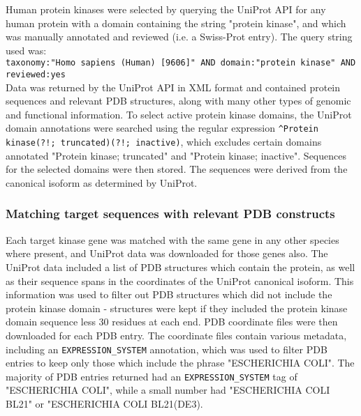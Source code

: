 \documentclass[aps,pre,twocolumn,nofootinbib,superscriptaddress,linenumbers]{revtex4-1}
\begin{document}
Human protein kinases were selected by querying the UniProt API for any human protein with a domain containing the string "protein kinase", and which was manually annotated and reviewed (i.e. a Swiss-Prot entry).
The query string used was:\\
{\tt taxonomy:"Homo sapiens (Human) [9606]" AND domain:"protein kinase" AND reviewed:yes}\\
Data was returned by the UniProt API in XML format and contained protein sequences and relevant PDB structures, along with many other types of genomic and functional information.
To select active protein kinase domains, the UniProt domain annotations were searched using the regular expression {\tt \^{}Protein kinase(?!; truncated)(?!; inactive)}, which excludes certain domains annotated "Protein kinase; truncated" and "Protein kinase; inactive".
Sequences for the selected domains were then stored.
The sequences were derived from the canonical isoform as determined by UniProt.

\subsubsection{Matching target sequences with relevant PDB constructs}

Each target kinase gene was matched with the same gene in any other species where present, and UniProt data was downloaded for those genes also.
The UniProt data included a list of PDB structures which contain the protein, as well as their sequence spans in the coordinates of the UniProt canonical isoform.
This information was used to filter out PDB structures which did not include the protein kinase domain - structures were kept if they included the protein kinase domain sequence less 30 residues at each end.
PDB coordinate files were then downloaded for each PDB entry.
The coordinate files contain various metadata, including an {\tt EXPRESSION\_SYSTEM} annotation, which was used to filter PDB entries to keep only those which include the phrase "ESCHERICHIA COLI".
The majority of PDB entries returned had an {\tt EXPRESSION\_SYSTEM} tag of "ESCHERICHIA COLI", while a small number had "ESCHERICHIA COLI BL21" or "ESCHERICHIA COLI BL21(DE3).
\end{document}
